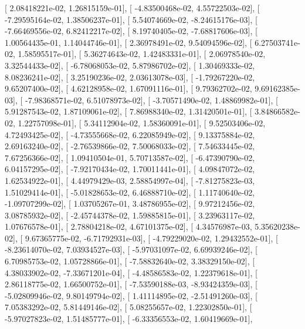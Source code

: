 \documentclass{article}
\begin{document}
       [  2.08418221e-02,   1.26815159e-01],
       [ -4.83500468e-02,   4.55722503e-02],
       [ -7.29595164e-02,   1.38506237e-01],
       [  5.54074669e-02,  -8.24615176e-03],
       [ -7.66469556e-02,   6.82412217e-02],
       [  8.19740405e-02,  -7.68817606e-03],
       [  1.00564435e-01,   1.14044746e-01],
       [  2.36978491e-02,   9.54094596e-02],
       [  6.27503741e-02,   1.58595517e-01],
       [  5.36274643e-02,   1.42483331e-01],
       [  2.06978540e-02,   3.32544433e-02],
       [ -6.78068053e-02,   5.87986702e-02],
       [  1.30469333e-02,   8.08236241e-02],
       [  3.25190236e-02,   2.03613078e-03],
       [ -1.79267220e-02,   9.65207400e-02],
       [  4.62128958e-02,   1.67091116e-01],
       [  9.79362702e-02,   9.69162385e-03],
       [ -7.98368571e-02,   6.51078973e-02],
       [ -3.70571490e-02,   1.48869982e-01],
       [  5.91287543e-02,   1.87109061e-02],
       [  7.86988340e-02,   1.31420501e-01],
       [  3.84866582e-02,   1.22757098e-01],
       [  5.34112904e-02,   1.58360091e-01],
       [  9.52503406e-02,   4.72493425e-02],
       [ -4.73555668e-02,   6.22085949e-02],
       [  9.13375884e-02,   2.69163240e-02],
       [ -2.76539866e-02,   7.50068033e-02],
       [  7.54633445e-02,   7.67256366e-02],
       [  1.09410504e-01,   5.70713587e-02],
       [ -6.47390790e-02,   6.04157295e-02],
       [ -7.92170434e-02,   1.70011441e-01],
       [  4.09847072e-02,   1.62534922e-01],
       [  4.44979429e-03,   2.58854997e-04],
       [ -7.81275823e-03,   1.51029414e-01],
       [ -5.01828653e-02,   6.46888710e-02],
       [  1.11740640e-02,  -1.09707299e-02],
       [  1.03705267e-01,   3.48786955e-02],
       [  9.97212456e-02,   3.08785932e-02],
       [ -2.45744378e-02,   1.59885815e-01],
       [  3.23963117e-02,   1.07676578e-01],
       [  2.78804218e-02,   4.67101375e-02],
       [  4.34576987e-03,   5.35620238e-02],
       [  9.67365775e-02,  -6.71792931e-03],
       [ -4.79229020e-02,   1.29432552e-01],
       [ -8.23614070e-02,   7.03934527e-03],
       [ -5.97031097e-02,   6.69939246e-02],
       [  6.70985753e-02,   1.05728866e-01],
       [ -7.58832640e-02,   3.38329150e-02],
       [  4.38033902e-02,  -7.33671201e-04],
       [ -4.48586583e-02,   1.22379618e-01],
       [  2.86118775e-02,   1.66500752e-01],
       [ -7.53590188e-03,  -8.93424359e-03],
       [ -5.02809946e-02,   9.80149794e-02],
       [  1.41114895e-02,  -2.51491260e-03],
       [  7.05383292e-02,   5.81449146e-02],
       [  5.08255657e-02,   1.22302850e-01],
       [ -5.97027823e-02,   1.51485777e-01],
       [ -6.33356553e-02,   1.60419669e-01],
\end{document}
